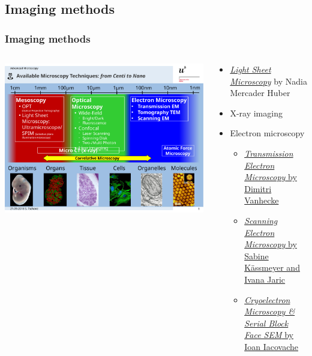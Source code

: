 \begin{frame}
\begin{columns}
\begin{column}{0.38\textwidth}
{%
      }%
    \end{column}%
  \end{columns}%
\end{frame}

\subsection{Imaging methods}
\begin{frame}
  \frametitle{Imaging methods}
  \begin{columns}
    \begin{column}{0.5\textwidth}
      \includegraphics[height=\imageheight]{./images/MIC-AM_techniques}%
    \end{column}
    \begin{column}{0.5\textwidth}
      \begin{itemize}
        \item \href{https://ilias.unibe.ch/goto_ilias3_unibe_sess_3022933.html}{\emph{Light Sheet Microscopy}} by Nadia Mercader Huber
        \item X-ray imaging
        \item Electron microscopy
          \begin{itemize}
            \item \href{https://ilias.unibe.ch/goto_ilias3_unibe_sess_3022941.html}{\emph{Transmission Electron Microscopy} by Dimitri Vanhecke}
            \item \href{https://ilias.unibe.ch/goto_ilias3_unibe_sess_3022943.html}{\emph{Scanning Electron Microscopy} by Sabine Kässmeyer and Ivana Jaric}
            \item \href{https://ilias.unibe.ch/goto_ilias3_unibe_sess_3022945.html}{\emph{Cryoelectron Microscopy \& Serial Block Face SEM} by Ioan Iacovache}
          \end{itemize}
      \end{itemize}
    \end{column}
  \end{columns}
\end{frame}

